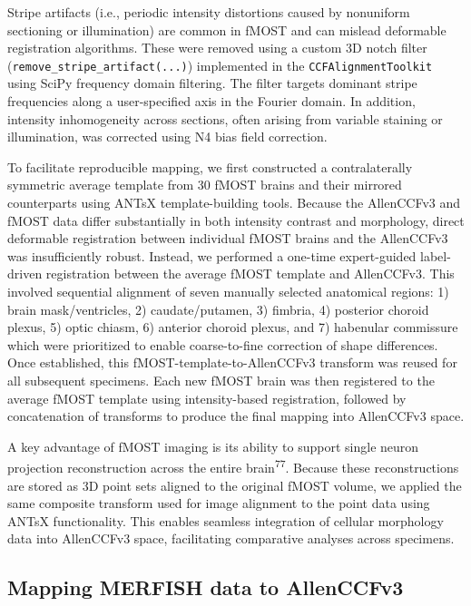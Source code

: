 \documentclass[
  12pt,
]{article}
\begin{document}
Stripe artifacts (i.e., periodic intensity distortions caused by
nonuniform sectioning or illumination) are common in fMOST and can
mislead deformable registration algorithms. These were removed using a
custom 3D notch filter (\texttt{remove\_stripe\_artifact(...)})
implemented in the \texttt{CCFAlignmentToolkit} using SciPy frequency
domain filtering. The filter targets dominant stripe frequencies along a
user-specified axis in the Fourier domain. In addition, intensity
inhomogeneity across sections, often arising from variable staining or
illumination, was corrected using N4 bias field correction.

To facilitate reproducible mapping, we first constructed a
contralaterally symmetric average template from 30 fMOST brains and
their mirrored counterparts using ANTsX template-building tools. Because
the AllenCCFv3 and fMOST data differ substantially in both intensity
contrast and morphology, direct deformable registration between
individual fMOST brains and the AllenCCFv3 was insufficiently robust.
Instead, we performed a one-time expert-guided label-driven registration
between the average fMOST template and AllenCCFv3. This involved
sequential alignment of seven manually selected anatomical regions: 1)
brain mask/ventricles, 2) caudate/putamen, 3) fimbria, 4) posterior
choroid plexus, 5) optic chiasm, 6) anterior choroid plexus, and 7)
habenular commissure which were prioritized to enable coarse-to-fine
correction of shape differences. Once established, this
fMOST-template-to-AllenCCFv3 transform was reused for all subsequent
specimens. Each new fMOST brain was then registered to the average fMOST
template using intensity-based registration, followed by concatenation
of transforms to produce the final mapping into AllenCCFv3 space.

A key advantage of fMOST imaging is its ability to support single neuron
projection reconstruction across the entire brain\textsuperscript{77}.
Because these reconstructions are stored as 3D point sets aligned to the
original fMOST volume, we applied the same composite transform used for
image alignment to the point data using ANTsX functionality. This
enables seamless integration of cellular morphology data into AllenCCFv3
space, facilitating comparative analyses across specimens.

\subsection{Mapping MERFISH data to
AllenCCFv3}\label{mapping-merfish-data-to-allenccfv3}
\end{document}
